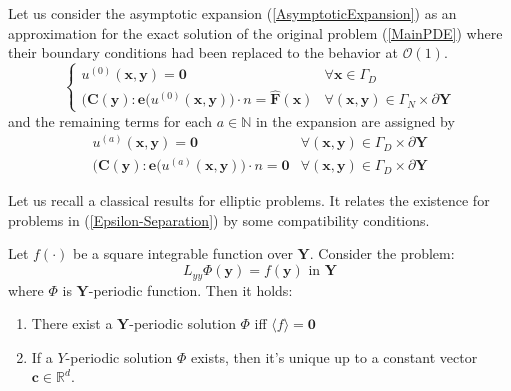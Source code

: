 Let us consider the asymptotic expansion (\ref{AsymptoticExpansion}) as an approximation for the exact solution of the original problem (\ref{MainPDE}) where their boundary conditions had been replaced to the behavior at $\mathcal{O}(1)$.
\begin{equation*}
    \left \{
    \begin{array}{cc}   
        u^{(0)}(\mathbf{x},\mathbf{y}) = \mathbf{0} & \forall \mathbf{x} \in \Gamma_D\\
        \big(\mathbf{C}(\mathbf{y}): \mathbf{e} (u^{(0)}(\mathbf{x}, \mathbf{y}) \big) \cdot n = \hat{\mathbf{F}}(\mathbf{x}) & \forall (\mathbf{x},\mathbf{y}) \in \Gamma_N \times \partial \mathbf{Y}
    \end{array}
    \right .
\end{equation*}
and the remaining terms for each $a \in \mathbb{N}$ in the expansion are assigned by
\begin{equation*}
    \begin{array}{cc}
        u^{(a)}(\mathbf{x},\mathbf{y}) = \mathbf{0} & \forall (\mathbf{x}, \mathbf{y}) \in \Gamma_D\times \partial \mathbf{Y} \\
        \big( \mathbf{C}(\mathbf{y}): \mathbf{e} (u^{(a)}(\mathbf{x},\mathbf{y}) \big) \cdot n = \mathbf{0} & \forall  (\mathbf{x}, \mathbf{y}) \in \Gamma_D\times \partial \mathbf{Y} 
    \end{array}
\end{equation*}

Let us recall a classical results for elliptic problems. It relates the existence for problems in (\ref{Epsilon-Separation}) by some compatibility conditions.
\begin{lem}
\label{ExistenceLemma}
Let $f(\cdot)$ be a square integrable function over $\mathbf{Y}$. Consider the problem:
\begin{equation*}
    L_{yy} \Phi(\mathbf{y}) = f(\mathbf{y}) \text{ in } \mathbf{Y}
\end{equation*}
where $\Phi$ is $\mathbf{Y}$-periodic function. Then it holds:
\begin{enumerate}
    \item There exist a $\mathbf{Y}$-periodic solution $\Phi$ iff $\langle f \rangle = \mathbf{0}$
    \item If a $Y$-periodic solution $\Phi$ exists, then it's unique up to a constant vector $\mathbf{c} \in \mathbb{R}^d$.
\end{enumerate}
\end{lem}

